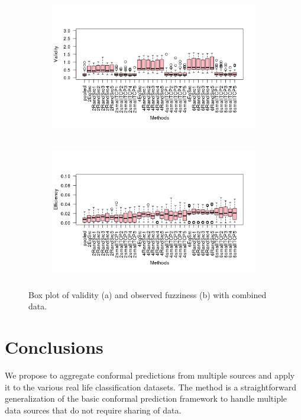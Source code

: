 \documentclass[main]{subfiles}
\begin{document}
 \begin{figure}[H]
\centering
\begin{subfigure}{\textwidth}\centering
  \includegraphics[width=12cm,height=6cm]{images/boxplotCombined}
\end{subfigure}%

\begin{subfigure}{\textwidth} \centering
 
  \includegraphics[width=12cm,height=6cm]{images/boxplotCombined_eff}
\end{subfigure}%
\caption{Box plot of validity (a) and observed fuzziness (b) with combined data.} \label{fig:boxplotCombined}
\end{figure}



\section{Conclusions}
We propose to aggregate conformal predictions from multiple sources and apply it to the various real life classification datasets. The  method  is  a  straightforward
generalization of the basic conformal prediction framework to handle multiple data sources that do not require sharing of data. %
\end{document}
